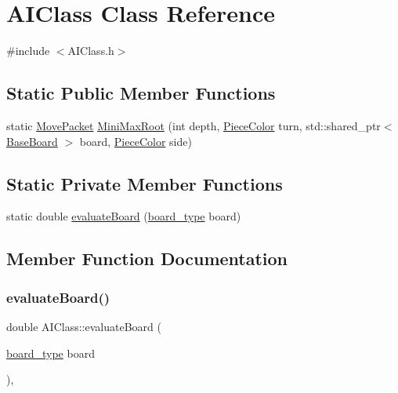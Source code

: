 \hypertarget{class_a_i_class}{}\section{A\+I\+Class Class Reference}
\label{class_a_i_class}


{\ttfamily \#include $<$A\+I\+Class.\+h$>$}

\subsection*{Static Public Member Functions}
\begin{DoxyCompactItemize}
\item 
static \hyperlink{struct_move_packet}{Move\+Packet} \hyperlink{class_a_i_class_a1331ae0a516f5987f0f23048d42edc95}{Mini\+Max\+Root} (int depth, \hyperlink{_piece_8h_ad7595c48bb74c0dd2a7648712a2d4985}{Piece\+Color} turn, std\+::shared\+\_\+ptr$<$ \hyperlink{class_base_board}{Base\+Board} $>$ board, \hyperlink{_piece_8h_ad7595c48bb74c0dd2a7648712a2d4985}{Piece\+Color} side)
\end{DoxyCompactItemize}
\subsection*{Static Private Member Functions}
\begin{DoxyCompactItemize}
\item 
static double \hyperlink{class_a_i_class_afa75cf730441084f18ad3007d9e32574}{evaluate\+Board} (\hyperlink{_a_i_class_8h_a6e73002e9c84a7986c39d7e80e83dc8d}{board\+\_\+type} board)
\end{DoxyCompactItemize}


\subsection{Member Function Documentation}
\mbox{\label{class_a_i_class_afa75cf730441084f18ad3007d9e32574}} 
\subsubsection{\texorpdfstring{evaluate\+Board()}{evaluateBoard()}}
{\footnotesize\ttfamily double A\+I\+Class\+::evaluate\+Board (\begin{DoxyParamCaption}\item[{\hyperlink{_a_i_class_8h_a6e73002e9c84a7986c39d7e80e83dc8d}{board\+\_\+type}}]{board }\end{DoxyParamCaption})\hspace{0.3cm}{\ttfamily [static]}, {\ttfamily [private]}}

